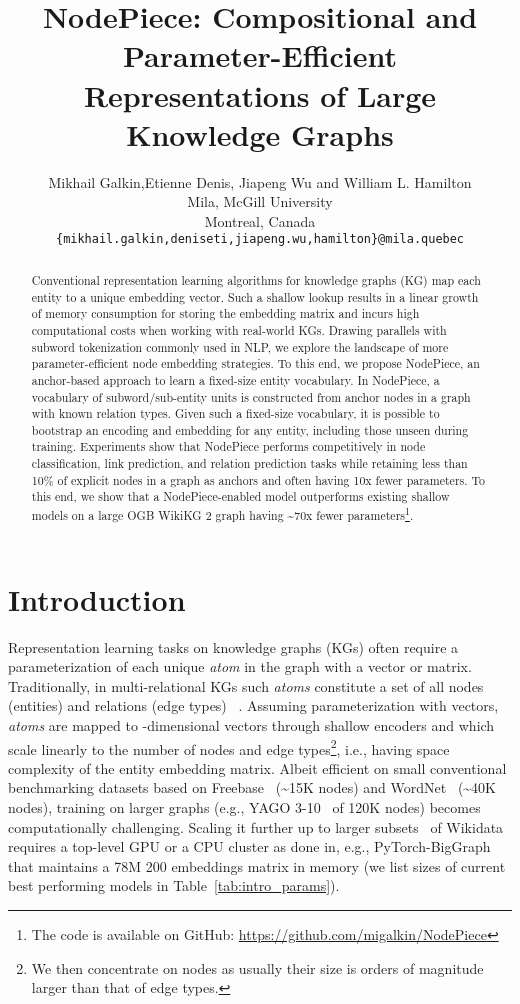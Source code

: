 \documentclass{article} \usepackage{iclr2022_conference,times}
\title{NodePiece: Compositional and Parameter-Efficient Representations of Large Knowledge Graphs}
\author{Mikhail Galkin,Etienne Denis, Jiapeng Wu and William L. Hamilton \\
Mila, McGill University\\
Montreal, Canada\\
\texttt{\{mikhail.galkin,deniseti,jiapeng.wu,hamilton\}@mila.quebec} \\
}
\begin{document}
\maketitle

\begin{abstract}
Conventional representation learning algorithms for knowledge graphs (KG) map each entity to a unique embedding vector. 
  Such a shallow lookup results in a linear growth of memory consumption for storing the embedding matrix and incurs high computational costs when working with real-world KGs. Drawing parallels with subword tokenization commonly used in NLP, we explore the landscape of more parameter-efficient node embedding strategies. To this end, we propose NodePiece, an anchor-based approach to learn a fixed-size entity vocabulary. In NodePiece, a vocabulary of subword/sub-entity units is constructed from anchor nodes in a graph with known relation types. Given such a fixed-size vocabulary, it is possible to bootstrap an encoding and embedding for any entity, including those unseen during training.
Experiments show that NodePiece performs competitively in node classification, link prediction, and  relation prediction tasks while retaining less than 10\% of explicit nodes in a graph as anchors and often having 10x fewer parameters. To this end, we show that a NodePiece-enabled model outperforms existing shallow models on a large OGB WikiKG 2 graph having \textasciitilde{}70x fewer parameters\footnote{The code is available on GitHub: \url{https://github.com/migalkin/NodePiece}}.
\end{abstract}
\section{Introduction}


Representation learning tasks on knowledge graphs (KGs) often require a parameterization of each unique \emph{atom} in the graph with a vector or matrix. 
Traditionally, in multi-relational KGs such \emph{atoms} constitute a set of all nodes  (entities) and relations (edge types) ~\citep{DBLP:journals/pieee/Nickel0TG16}. 
Assuming parameterization with vectors, \emph{atoms} are mapped to -dimensional vectors through shallow encoders  and  which scale linearly to the number of nodes and edge types\footnote{We then concentrate on nodes as usually their size is orders of magnitude larger than that of edge types.}, i.e., having  space complexity of the entity embedding matrix.
Albeit efficient on small conventional benchmarking datasets based on Freebase~\citep{toutanova-chen-2015-observed} (\textasciitilde{}15K nodes) and WordNet~\citep{DBLP:conf/aaai/DettmersMS018} (\textasciitilde{}40K nodes), training on larger graphs (e.g., YAGO 3-10~\citep{DBLP:conf/cidr/MahdisoltaniBS15} of 120K nodes) becomes computationally challenging. Scaling it further up to larger subsets~\citep{DBLP:conf/nips/HuFZDRLCL20,DBLP:journals/tacl/WangGZZLLT21,safavi-koutra-2020-codex} of Wikidata~\citep{DBLP:journals/cacm/VrandecicK14} requires a top-level GPU or a CPU cluster as done in, e.g., PyTorch-BigGraph~\citep{pbg} that maintains a 78M  200 embeddings matrix in memory (we list sizes of current best performing models in Table~\ref{tab:intro_params}).
\end{document}

